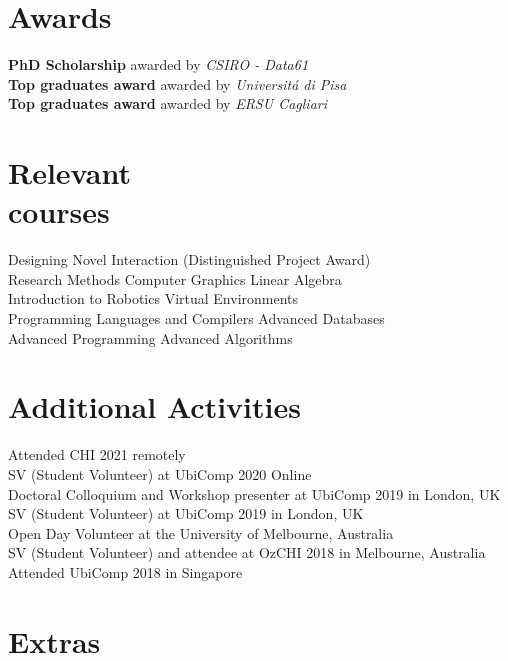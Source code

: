 \documentclass[margin]{res}
\renewcommand{\sectionfont}{\fontfamily{lmss}\selectfont}
\begin{document}
\begin{resume}
\section{Awards}
\textbullet{} \textbf{PhD Scholarship} awarded by \textit{CSIRO - Data61}\\
\textbullet{} \textbf{Top graduates award} awarded by \textit{Universit\'{a} di Pisa}\\
\textbullet{} \textbf{Top graduates award} awarded by \textit{ERSU Cagliari}


\section{Relevant\\courses}
\par
\textbullet{} Designing Novel Interaction (Distinguished Project Award) \\
\textbullet{} Research Methods
\textbullet{} Computer Graphics
\textbullet{} Linear Algebra \\
\textbullet{} Introduction to Robotics
\textbullet{} Virtual Environments \\
\textbullet{} Programming Languages and Compilers
\textbullet{} Advanced Databases \\
\textbullet{} Advanced Programming
\textbullet{} Advanced Algorithms

\section{Additional Activities}

\textbullet{} Attended CHI 2021 remotely\\
\textbullet{} SV (Student Volunteer) at UbiComp 2020 Online\\
\textbullet{} Doctoral Colloquium and Workshop presenter at UbiComp 2019 in London, UK\\
\textbullet{} SV (Student Volunteer) at UbiComp 2019 in London, UK\\
\textbullet{} Open Day Volunteer at the University of Melbourne, Australia \\
\textbullet{} SV (Student Volunteer) and attendee at OzCHI 2018 in Melbourne, Australia \\
\textbullet{} Attended UbiComp 2018 in Singapore\\


\section{Extras}


\end{resume}
\end{document}
